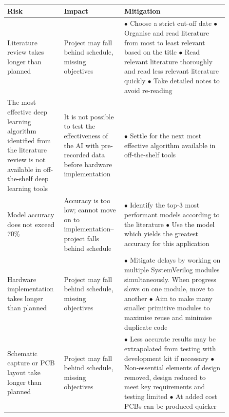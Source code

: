 \documentclass{article}
\begin{document}
\begin{longtable}{R{0.22\linewidth} R{0.24\linewidth} R{0.44\linewidth}}
        \textbf{Risk} & \textbf{Impact} & \textbf{Mitigation} \\ \hline
         Literature review takes longer than planned & 
        Project may fall behind schedule, missing objectives & 
        $\bullet$ Choose a strict cut-off date 
        \linebreak$\bullet$ Organise and read literature from most to least relevant based on the title 
        \linebreak$\bullet$ Read relevant literature thoroughly and read less relevant literature quickly 
        \linebreak$\bullet$ Take detailed notes to avoid re-reading \vspace{5pt} \\

         The most effective deep learning algorithm identified from the literature review is not available in off-the-shelf deep learning tools & It is not possible to test the effectiveness of the AI with pre-recorded data before hardware implementation & $\bullet$ Settle for the next most effective algorithm available in off-the-shelf tools \vspace{5pt} \\ 
        
          Model accuracy does not exceed 70\% & Accuracy is too low; cannot move on to implementation--project falls behind schedule & $\bullet$ Identify the top-3 most performant models according to the literature
         \linebreak$\bullet$ Use the model which yields the greatest accuracy for this application \vspace{5pt} \\

         Hardware implementation takes longer than planned & Project may fall behind schedule, missing objectives & $\bullet$ Mitigate delays by working on multiple SystemVerilog modules simultaneously. When progress slows on one module, move to another \linebreak$\bullet$ Aim to make many smaller primitive modules to maximise reuse and minimise duplicate code \vspace{5pt} \\

           Schematic capture or PCB layout take longer than planned & Project may fall behind schedule, missing objectives & $\bullet$ Less accurate results may be extrapolated from testing with development kit if necessary \linebreak$\bullet$ Non-essential elements of design removed, design reduced to meet key requirements and testing limited \linebreak$\bullet$ At added cost PCBs can be produced quicker \vspace{5pt} \\
    

\end{longtable}
\end{document}
